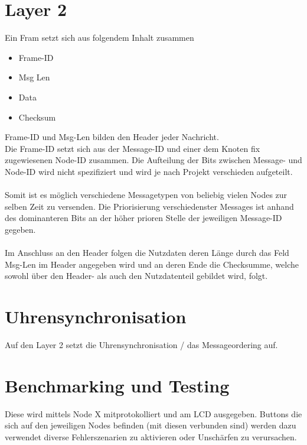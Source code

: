 \documentclass[11pt,a4paper,oneside]{report}
\begin{document}
\section{Layer 2}

Ein Fram setzt sich aus folgendem Inhalt zusammen
\begin{itemize}
  \item Frame-ID
  \item Msg Len
  \item Data
  \item Checksum
\end{itemize}

Frame-ID und Msg-Len bilden den Header jeder Nachricht.
\\
Die Frame-ID setzt sich aus der Message-ID und einer dem Knoten fix zugewiesenen Node-ID zusammen.
Die Aufteilung der Bits zwischen Message- und Node-ID wird nicht spezifiziert und wird je nach Projekt verschieden aufgeteilt.\\
\\
Somit ist es möglich verschiedene Messagetypen von beliebig vielen Nodes zur selben Zeit zu versenden.
Die Priorisierung verschiedenster Messages ist anhand des dominanteren Bits an der höher prioren Stelle der jeweiligen Message-ID gegeben.\\
\\
Im Anschluss an den Header folgen die Nutzdaten deren Länge durch das Feld Msg-Len im Header angegeben wird und an deren Ende die Checksumme, welche sowohl über den Header- als auch den Nutzdatenteil gebildet wird, folgt.\\

\section{Uhrensynchronisation}
Auf den Layer 2 setzt die Uhrensynchronisation / das Messageordering auf.

\section{Benchmarking und Testing}
Diese wird mittels Node X mitprotokolliert und am LCD ausgegeben.
Buttons die sich auf den jeweiligen Nodes befinden (mit diesen verbunden sind) werden dazu verwendet diverse Fehlerszenarien zu aktivieren oder Unschärfen zu verursachen.\\ 
\end{document}
